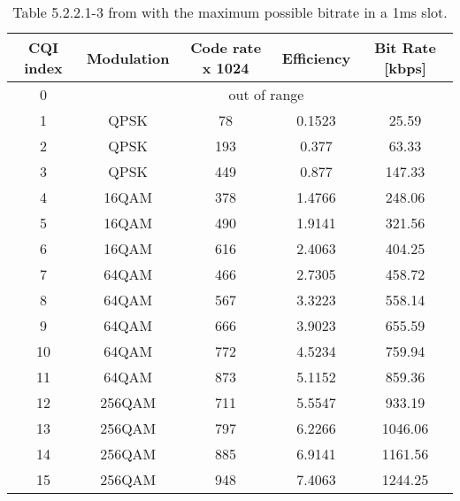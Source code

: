 \begin{itemize}
\begin{itemize}
        \begin{table}[h]
            \centering
            \caption{Table 5.2.2.1-3 from \cite{3gpp-codebooks} with the maximum possible bitrate in a 1ms slot.}
            \label{tab:mcs}
            \begin{tabular}{|c|c|c|c|c|} 
            \hline
            CQI index & Modulation & Code rate x 1024 & Efficiency & Bit Rate [kbps]  \\ 
            \hline
            0         & \multicolumn{4}{c|}{out of range}                             \\ 
            \hline
            1         & QPSK       & 78               & 0.1523     & 25.59            \\ 
            \hline
            2         & QPSK       & 193              & 0.377      & 63.33            \\ 
            \hline
            3         & QPSK       & 449              & 0.877      & 147.33           \\ 
            \hline
            4         & 16QAM      & 378              & 1.4766     & 248.06           \\ 
            \hline
            5         & 16QAM      & 490              & 1.9141     & 321.56           \\ 
            \hline
            6         & 16QAM      & 616              & 2.4063     & 404.25           \\ 
            \hline
            7         & 64QAM      & 466              & 2.7305     & 458.72           \\ 
            \hline
            8         & 64QAM      & 567              & 3.3223     & 558.14           \\ 
            \hline
            9         & 64QAM      & 666              & 3.9023     & 655.59           \\ 
            \hline
            10        & 64QAM      & 772              & 4.5234     & 759.94           \\ 
            \hline
            11        & 64QAM      & 873              & 5.1152     & 859.36           \\ 
            \hline
            12        & 256QAM     & 711              & 5.5547     & 933.19           \\ 
            \hline
            13        & 256QAM     & 797              & 6.2266     & 1046.06          \\ 
            \hline
            14        & 256QAM     & 885              & 6.9141     & 1161.56          \\ 
            \hline
            15        & 256QAM     & 948              & 7.4063     & 1244.25          \\
            \hline
            \end{tabular}
        \end{table}

    \end{itemize}
\end{itemize}
